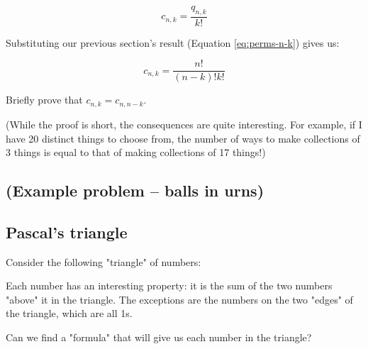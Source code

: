 \begin{equation*}
c_{n,k} = \frac{q_{n,k}}{k!}
\end{equation*}

Substituting our previous section's result (Equation \ref{eq:perms-n-k}) gives us:

\begin{equation}
c_{n,k} = \frac{n!}{(n-k)! k!}
\end{equation}



\begin{exercise}
\label{ex:binom-coeff-symmetry}
Briefly prove that $c_{n,k} = c_{n,n-k}$.

(While the proof is short, the consequences are quite interesting. For example, if I have 20 distinct things to choose from, the number of ways to make collections of 3 things is equal to that of making collections of 17 things!)
\end{exercise}



\subsection{(Example problem -- balls in urns)}

\subsection{Pascal's triangle}


Consider the following "triangle" of numbers:


Each number has an interesting property: it is the sum of the two numbers "above" it in the triangle. The exceptions are the numbers on the two "edges" of the triangle, which are all 1s.

Can we find a "formula" that will give us each number in the triangle?

